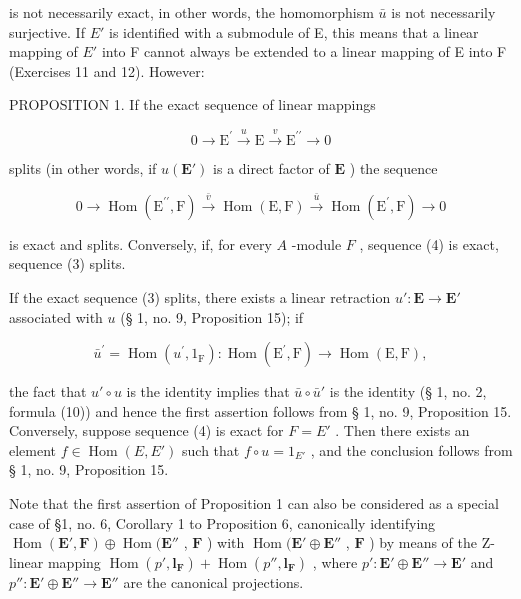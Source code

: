 is not necessarily exact, in other words, the homomorphism \(\bar{u}\) is not necessarily surjective. If \(E'\) is identified with a submodule of E, this means that a linear mapping of \(E'\) into F cannot always be extended to a linear mapping of E into F (Exercises 11 and 12). However:

PROPOSITION 1. If the exact sequence of linear mappings

\[
0 \longrightarrow \mathrm{E} ^ {\prime} \stackrel {u} {\longrightarrow} \mathrm{E} \stackrel {v} {\longrightarrow} \mathrm{E} ^ {\prime \prime} \longrightarrow 0\tag{3}
\]

splits (in other words, if \(u(\mathbf{E}')\) is a direct factor of \(\mathbf{E}\) ) the sequence

\[
0 \longrightarrow \operatorname{Hom} (\mathrm{E} ^ {\prime \prime}, \mathrm{F}) \stackrel {\bar {v}} {\longrightarrow} \operatorname{Hom} (\mathrm{E}, \mathrm{F}) \stackrel {\bar {u}} {\longrightarrow} \operatorname{Hom} (\mathrm{E} ^ {\prime}, \mathrm{F}) \longrightarrow 0
\]

is exact and splits. Conversely, if, for every \(A\) -module \(F\) , sequence (4) is exact, sequence (3) splits.

If the exact sequence (3) splits, there exists a linear retraction \(u': \mathbf{E} \to \mathbf{E}'\) associated with \(u\) (§ 1, no. 9, Proposition 15); if

\[
\bar {u} ^ {\prime} = \operatorname{Hom} (u ^ {\prime}, 1 _ {\mathrm{F}}): \operatorname{Hom} (\mathrm{E} ^ {\prime}, \mathrm{F}) \rightarrow \operatorname{Hom} (\mathrm{E}, \mathrm{F}),
\]

the fact that \(u' \circ u\) is the identity implies that \(\bar{u} \circ \bar{u}'\) is the identity (§ 1, no. 2, formula (10)) and hence the first assertion follows from § 1, no. 9, Proposition 15. Conversely, suppose sequence (4) is exact for \(F = E'\) . Then there exists an element \(f \in \operatorname{Hom}(E, E')\) such that \(f \circ u = 1_{E'}\) , and the conclusion follows from § 1, no. 9, Proposition 15.

Note that the first assertion of Proposition 1 can also be considered as a special case of §1, no. 6, Corollary 1 to Proposition 6, canonically identifying \(\operatorname{Hom}(\mathbf{E}',\mathbf{F}) \oplus \operatorname{Hom}(\mathbf{E}''\) , \(\mathbf{F}\) ) with \(\operatorname{Hom}(\mathbf{E}' \oplus \mathbf{E}''\) , \(\mathbf{F}\) ) by means of the Z-linear mapping \(\operatorname{Hom}(p',\mathbf{l}_{\mathbf{F}}) + \operatorname{Hom}(p'',\mathbf{l}_{\mathbf{F}})\) , where \(p':\mathbf{E}' \oplus \mathbf{E}'' \to \mathbf{E}'\) and \(p'':\mathbf{E}' \oplus \mathbf{E}'' \to \mathbf{E}''\) are the canonical projections.

